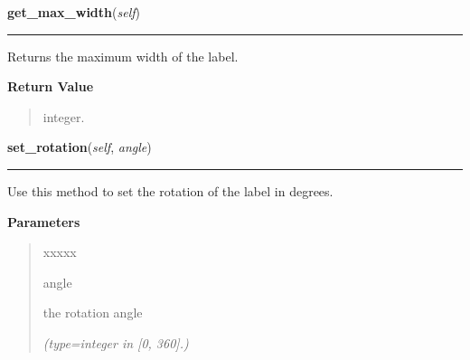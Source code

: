     \label{pygtk_chart:label:Label:get_max_width}

    \vspace{0.5ex}

\hspace{.8\funcindent}\begin{boxedminipage}{\funcwidth}

    \raggedright \textbf{get\_max\_width}(\textit{self})

    \vspace{-1.5ex}

    \rule{\textwidth}{0.5\fboxrule}
\setlength{\parskip}{2ex}
    Returns the maximum width of the label.

\setlength{\parskip}{1ex}
      \textbf{Return Value}
    \vspace{-1ex}

      \begin{quote}
      integer.

      \end{quote}

    \end{boxedminipage}

    \label{pygtk_chart:label:Label:set_rotation}

    \vspace{0.5ex}

\hspace{.8\funcindent}\begin{boxedminipage}{\funcwidth}

    \raggedright \textbf{set\_rotation}(\textit{self}, \textit{angle})

    \vspace{-1.5ex}

    \rule{\textwidth}{0.5\fboxrule}
\setlength{\parskip}{2ex}
    Use this method to set the rotation of the label in degrees.

\setlength{\parskip}{1ex}
      \textbf{Parameters}
      \vspace{-1ex}

      \begin{quote}
        \begin{Ventry}{xxxxx}

          \item[angle]

          the rotation angle

            {\it (type=integer in [0, 360].)}

        \end{Ventry}

      \end{quote}

    \end{boxedminipage}

